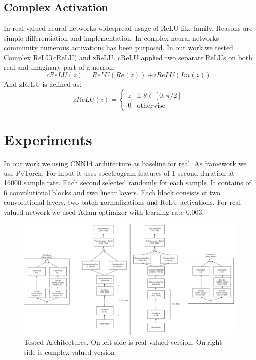 \documentclass{article}
\begin{document}
\subsection{Complex Activation}
In real-valued neural networks widespread usage of ReLU-like family. Reasons are simple differentiation and implementation. In complex neural networks community numerous activations has been purposed.
 In our work we tested Complex ReLU(cReLU)\citet{Trabelsi2017} and zReLU\citep{guberman2016complex}. cReLU applied two separate ReLUs on both real and imaginary part of a neuron:
 \begin{equation}
	cReLU\left(z\right)=ReLU\left(Re\left(z\right)\right)+iReLU(Im(z))
\end{equation}
And zReLU is defined as:
\begin{equation}
	zReLU(z)=
	\begin{cases} 
		z & \text{if $\theta \in [0,\pi/2]$}\\
		0 & \text{otherwise}
	\end{cases}
\end{equation}


\section{Experiments}
\label{sec:experiments}
In our work we using CNN14 architecture \citep{Kong2019} as baseline for real. As framework we use 
PyTorch\citep{NEURIPS2019_9015}. For input it uses spectrogram features of 1 second duration at 
16000 sample rate. Each second selected randomly for each sample. 
It contains of 6 convolutional blocks and two linear layers. Each block consists of two 
convolutional layers, two batch normalizations and ReLU activations.
For real-valued network we used Adam optimizer with learning rate 0.003.

\begin{figure}
	\centering
	\includegraphics[width=0.49\linewidth]{assets/arch.png}
	\caption{Tested Architectures. On left side is real-valued version. On right side is complex-valued version}
	\label{fig:architectures}
\end{figure}
\end{document}
